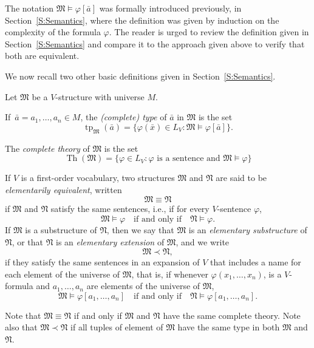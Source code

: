 \documentclass{scrartcl}
\DeclareMathOperator{\Th}{Th}
\DeclareMathOperator{\tp}{tp}
\renewcommand{\phi}{\varphi}
\newcommand{\FM}{\mathfrak{M}}
\newcommand{\FN}{\mathfrak{N}}
\begin{document}
The notation $\mathfrak{M}\models \varphi[\bar a]$ was formally introduced previously, in Section~\ref{S:Semantics}, where the definition was given by induction on the complexity of the formula $\phi$. The reader is urged to review the definition given in Section~\ref{S:Semantics}  and compare it to the approach given above to verify that both are equivalent.

We now recall two other basic definitions given in Section~\ref{S:Semantics}.

\begin{definition}
\label{D:type}
Let $\mathfrak{M}$ be a $V$-structure with universe $M$.

If $\bar a= a_1,\dots, a_n\in M$, the \emph{(complete) type} of $\bar a$ in $\mathfrak{M}$ is the set
\[
\tp_{\mathfrak M}(\bar a)=
\{\varphi(\bar x)\in L_V \colon \mathfrak{M}\models\varphi[\bar a] \}.
\]

The \emph{complete theory} of $\mathfrak{M}$ is the set
\[ 
\Th(\mathfrak{M}) = \{ \varphi\in L_V \colon \varphi \text{ is a sentence and } \mathfrak{M}\models\varphi \}
\]
\end{definition}


\begin{definition}
If $V$ is a first-order vocabulary, two structures $\mathfrak{M}$ and $\mathfrak{N}$ are said to be \emph{elementarily equivalent}, written
\[
\mathfrak{M}\equiv\mathfrak{N}
\]
if $\mathfrak{M}$ and $\mathfrak{N}$ satisfy the same sentences, i.e., if
for every $V$-sentence $\varphi$,
\[
\mathfrak{M}\models \varphi
\quad\text{if and only if}\quad
\mathfrak{N} \models \varphi.
\]
If $\mathfrak{M}$ is a substructure of $\mathfrak{N}$, then we say that $\mathfrak{M}$ is an \emph{elementary substructure} of $\mathfrak{N}$, or that $\mathfrak{N}$ is an \emph{elementary extension} of $\mathfrak{M}$, and we  write
\[
\mathfrak{M}\prec\mathfrak{N},
\]
if they satisfy the same sentences in an expansion of $V$ that includes a name for each element of the universe of $\mathfrak{M}$, that is, if whenever $\varphi(x_1,\dots, x_n)$, is a $V$-formula and $a_1,\dots, a_n$ are elements of the universe of $\mathfrak{M}$, 
\[
\mathfrak{M}\models \varphi[a_1,\dots, a_n]
\quad\text{if and only if}\quad
\mathfrak{N} \models \varphi[a_1,\dots, a_n].
\]
\end{definition}

Note that $\mathfrak{M}\equiv\mathfrak{N}$ if and only if $\mathfrak{M}$ and $\mathfrak{N}$ have the same complete theory. Note also that $\mathfrak{M}\prec\mathfrak{N}$ if all tuples of element of $\FM$ have the same type in both $\FM$ and $\FN$.
\end{document}
